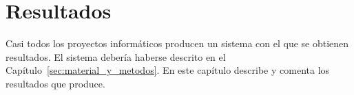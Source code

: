\chapter{Resultados}
\label{sec:resultados}

Casi todos los proyectos informáticos producen un sistema con el que
se obtienen resultados. El sistema debería haberse descrito en el
Capítulo~\ref{sec:material_y_metodos}. En este capítulo describe y comenta
los resultados que produce.

